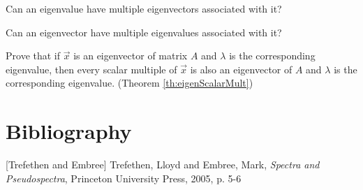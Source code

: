 \documentclass{ximera}
\begin{document}
\begin{problem}\label{prob:eigenmultchoice}
Can an eigenvalue have multiple eigenvectors associated with it? 
\begin{multipleChoice}
    \end{multipleChoice}
    
 Can an eigenvector have multiple eigenvalues associated with it?
 \begin{multipleChoice}
    \end{multipleChoice}
\end{problem}

\begin{problem}\label{prob:eigenScalarMult}
    Prove that if $\vec{x}$ is an eigenvector of matrix $A$ and $\lambda$ is the corresponding eigenvalue, then every scalar multiple of $\vec{x}$ is also an eigenvector of $A$ 
 and $\lambda$ is the corresponding eigenvalue. (Theorem \ref{th:eigenScalarMult})
\end{problem}

\section*{Bibliography}
[Trefethen and  Embree] Trefethen, Lloyd and Embree, Mark, {\it Spectra and Pseudospectra}, Princeton University Press, 2005, p. 5-6
\end{document}
